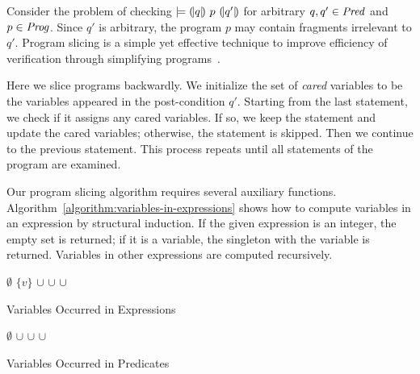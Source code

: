 
Consider the problem of checking $\models {(\!|}{q}{|\!)}~{p}~{(\!|}{q'}{|\!)}$ for
arbitrary $q, q' \in \mathit{Pred}$ and $p \in \mathit{Prog}$. Since $q'$ is arbitrary, the
program $p$ may contain fragments irrelevant to $q'$. Program slicing
is a simple yet effective technique to improve efficiency of
verification through simplifying programs~\cite{W:81:PS}.

Here we slice programs backwardly. We initialize the set
of \emph{cared} variables to be the variables appeared in the
post-condition $q'$. Starting from the last statement, we check if
it assigns any cared variables. If so, we keep the
statement and update the cared variables; otherwise, the
statement is skipped. Then we continue to the previous statement.
This process repeats until all statements of the
program are examined.

Our program slicing algorithm requires several auxiliary functions. 
Algorithm~\ref{algorithm:variables-in-expressions} shows how to
compute variables in an expression by structural
induction. If the given expression is an integer,
the empty set is returned; if it is a variable, the singleton with the
variable is returned. Variables in other expressions are computed
recursively. 

\begin{algorithm}
  \begin{algorithmic}[1]
        \Return $\emptyset$
      \EndCase
        \Return $\{ v \}$
      \EndCase
        \Return {}
      \EndCase
        \Return {} $\cup$ 
      \EndCase
        \Return {} $\cup$ 
      \EndCase
        \Return {} $\cup$ 
      \EndCase
        \Return {}
      \EndCase
    \EndMatch
    \EndFunction
  \end{algorithmic}
  \caption{Variables Occurred in Expressions}
  \label{algorithm:variables-in-expressions}
\end{algorithm}

\begin{algorithm}
\begin{algorithmic}[1]
    \Case{$\top$}
      \Return $\emptyset$
    \EndCase
      \Return {} $\cup$ 
    \EndCase
      \Return {} $\cup$ 
    \EndCase
      \Return {} $\cup$ 
    \EndCase
  \EndMatch
  \EndFunction
\end{algorithmic}
\caption{Variables Occurred in Predicates}
\label{algorithm:variables-in-predicates}
\end{algorithm}

